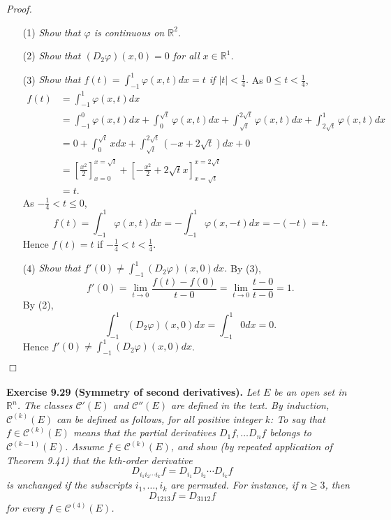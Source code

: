 \documentclass{article}
\begin{document}
\emph{Proof.}
\begin{enumerate}
\item[(1)]
  \emph{Show that $\varphi$ is continuous on $\mathbb{R}^2$.}

\item[(2)]
  \emph{Show that $(D_2 \varphi)(x,0) = 0$ for all $x \in \mathbb{R}^1$.}

\item[(3)]
  \emph{Show that $f(t) = \int_{-1}^{1} \varphi(x,t)dx = t$ if $|t| < \frac{1}{4}$.}
  As $0 \leq t < \frac{1}{4}$,
  \begin{align*}
    f(t)
    &= \int_{-1}^{1} \varphi(x,t)dx \\
    &= \int_{-1}^{0} \varphi(x,t)dx
      + \int_{0}^{\sqrt{t}} \varphi(x,t)dx
      + \int_{\sqrt{t}}^{2\sqrt{t}} \varphi(x,t)dx
      + \int_{2\sqrt{t}}^{1} \varphi(x,t)dx \\
    &= 0
      + \int_{0}^{\sqrt{t}} x dx
      + \int_{\sqrt{t}}^{2\sqrt{t}} (-x+2\sqrt{t})dx
      + 0 \\
    &= \left[ \frac{x^2}{2} \right]_{x=0}^{x=\sqrt{t}}
      + \left[ -\frac{x^2}{2} + 2\sqrt{t}x \right]_{x=\sqrt{t}}^{x=2\sqrt{t}} \\
    &= t.
  \end{align*}
  As $-\frac{1}{4} < t \leq 0$,
  \[
    f(t)
    = \int_{-1}^{1} \varphi(x,t)dx
    = -\int_{-1}^{1} \varphi(x,-t)dx
    = -(-t)
    = t.
  \]
  Hence $f(t) = t$ if $-\frac{1}{4} < t < \frac{1}{4}$.

\item[(4)]
  \emph{Show that $f'(0) \neq \int_{-1}^{1} (D_2 \varphi)(x,0) dx$.}
  By (3),
  \[
    f'(0)
    = \lim_{t \to 0} \frac{f(t) - f(0)}{t - 0}
    = \lim_{t \to 0} \frac{t - 0}{t - 0}
    = 1.
  \]
  By (2),
  \[
    \int_{-1}^{1} (D_2 \varphi)(x,0) dx
    = \int_{-1}^{1} 0 dx
    = 0.
  \]
  Hence $f'(0) \neq \int_{-1}^{1} (D_2 \varphi)(x,0) dx$.
\end{enumerate}
$\Box$ \\\\






\textbf{Exercise 9.29 (Symmetry of second derivatives).}
\emph{Let $E$ be an open set in $\mathbb{R}^n$.
The classes $\mathscr{C}'(E)$ and $\mathscr{C}''(E)$ are defined in the text.
By induction, $\mathscr{C}^{(k)}(E)$ can be defined as follows,
for all positive integer $k$:
To say that $f \in \mathscr{C}^{(k)}(E)$
means that the partial derivatives $D_1 f, \ldots D_n f$ belongs to $\mathscr{C}^{(k-1)}(E)$.
Assume $f \in \mathscr{C}^{(k)}(E)$, and show (by repeated application of Theorem 9.41)
that the $k$th-order derivative
\[
  D_{i_1 i_2 \cdots i_k} f = D_{i_1} D_{i_2} \cdots D_{i_k} f
\]
is unchanged if the subscripts $i_1,\ldots,i_k$ are permuted.
For instance, if $n \geq 3$, then
\[
  D_{1213} f = D_{3112} f
\]
for every $f \in \mathscr{C}^{(4)}(E)$.} \\
\end{document}
